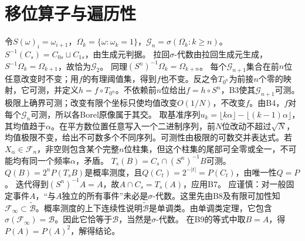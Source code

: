 \documentclass[UTF8,fontset=fandol,11pt]{ctexart}
\begin{document}
\section{移位算子与遍历性}
令$S(\omega)_i=\omega_{i+1}$，$\Omega_k=\{\omega:\omega_k=1\}$，$\mathcal G_n=\sigma(\Omega_k:k\ge n)$。
$S^{-1}(C_s)=C_{0s}\sqcup C_{1s}$，由生成元判据。
拉回$\sigma$-代数由拉回生成元生成，$S^{-1}\Omega_k=\Omega_{k+1}$，故恰为$\mathcal G_2$。
同理$(S^n)^{-1}\Omega_k=\Omega_{k+n}$。
每个$\mathcal G_{n+1}$集合在前$n$位任意改变时不变；用$f$的有理阈值集，得到$f$也不变。反之令$T_{0^n}$为前接$n$个零的映射，它可测，并定义$h=f\circ T_{0^n}$。不依赖前$n$位给出$f=h\circ S^n$，B3使其$\mathcal G_{n+1}$可测。
极限上确界可测；改变有限个坐标只使均值改变$O(1/N)$，不改变$f$。由B4，$f$对每个$\mathcal G_n$可测，所以各Borel原像属于其交。
取基准序列$u_k=\lfloor k\alpha\rfloor-\lfloor(k-1)\alpha\rfloor$，其均值趋于$\alpha$。在平方数位置任意写入一个二进制序列，前$N$位改动不超过$\sqrt N$，均值极限不变，给出不可数多个不同序列。可测性由极限的可数交并表达式。若$X_\alpha\in\mathcal F_n$，非空则包含某个完整$n$位柱集，但这个柱集的尾部可全零或全一，不可能均有同一个频率$\alpha$，矛盾。
$T_s(B)=C_s\cap(S^n)^{-1}B$可测。$Q(B)=2^nP(T_sB)$是概率测度，且$Q(C_t)=2^{-|t|}=P(C_t)$，由唯一性$Q=P$。
迭代得到$(S^n)^{-1}A=A$，故$A\cap C_s=T_s(A)$，应用B7。
应谨慎：对一般固定事件$A$，“与$A$独立的所有事件”未必是$\sigma$-代数。这里先由B8及有限可加性知$\mathcal F_\infty\subset\widetilde{\mathcal B}$。概率测度的上下连续性说明$\widetilde{\mathcal B}$是单调类。由单调类定理，它包含$\sigma(\mathcal F_\infty)=\mathcal B$。因此它恰等于$\mathcal B$，当然是$\sigma$-代数。
在B9的等式中取$B=A$，得$P(A)=P(A)^2$，解得结论。
\originalpages
\end{document}
